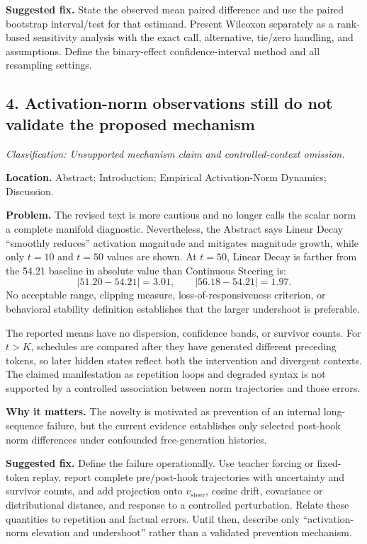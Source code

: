 \documentclass[11pt]{article}
\newcommand{\findinglabel}[1]{\textbf{#1}}
\newcommand{\classification}[1]{\textit{Classification: #1.}}
\begin{document}
\findinglabel{Suggested fix.} State the observed mean paired difference and use the paired bootstrap interval/test for that estimand.  Present Wilcoxon separately as a rank-based sensitivity analysis with the exact call, alternative, tie/zero handling, and assumptions.  Define the binary-effect confidence-interval method and all resampling settings.

\subsection*{4. Activation-norm observations still do not validate the proposed mechanism}

\classification{Unsupported mechanism claim and controlled-context omission}

\findinglabel{Location.} Abstract; Introduction; Empirical Activation-Norm Dynamics; Discussion.

\findinglabel{Problem.} The revised text is more cautious and no longer calls the scalar norm a complete manifold diagnostic.  Nevertheless, the Abstract says Linear Decay ``smoothly reduces'' activation magnitude and mitigates magnitude growth, while only $t=10$ and $t=50$ values are shown.  At $t=50$, Linear Decay is farther from the 54.21 baseline in absolute value than Continuous Steering is:
\[
|51.20-54.21|=3.01,
\qquad
|56.18-54.21|=1.97.
\]
No acceptable range, clipping measure, loss-of-responsiveness criterion, or behavioral stability definition establishes that the larger undershoot is preferable.

The reported means have no dispersion, confidence bands, or survivor counts.  For $t>K$, schedules are compared after they have generated different preceding tokens, so later hidden states reflect both the intervention and divergent contexts.  The claimed manifestation as repetition loops and degraded syntax is not supported by a controlled association between norm trajectories and those errors.

\findinglabel{Why it matters.} The novelty is motivated as prevention of an internal long-sequence failure, but the current evidence establishes only selected post-hook norm differences under confounded free-generation histories.

\findinglabel{Suggested fix.} Define the failure operationally.  Use teacher forcing or fixed-token replay, report complete pre/post-hook trajectories with uncertainty and survivor counts, and add projection onto $v_{\text{steer}}$, cosine drift, covariance or distributional distance, and response to a controlled perturbation.  Relate these quantities to repetition and factual errors.  Until then, describe only ``activation-norm elevation and undershoot'' rather than a validated prevention mechanism.
\end{document}
